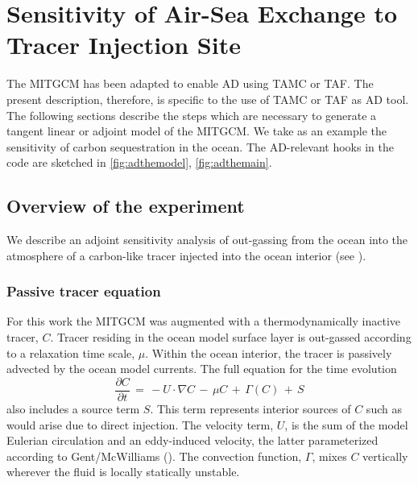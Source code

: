 
\section{Sensitivity of Air-Sea Exchange to Tracer Injection Site }
\label{www:tutorials}
\label{sect:eg-simple-tracer-adjoint}
\label{sec_ad_setup_ex}
\label{sect:tutorialIII}

The MITGCM has been adapted to enable AD using TAMC or TAF.
The present description, therefore, is specific to the
use of TAMC or TAF as AD tool.
The following sections describe the steps which are necessary to 
generate a tangent linear or adjoint model of the MITGCM.
We take as an example the sensitivity of carbon sequestration
in the ocean.
The AD-relevant hooks in the code are sketched in 
\ref{fig:adthemodel}, \ref{fig:adthemain}.

\subsection{Overview of the experiment}
\label{www:tutorials}

We describe an adjoint sensitivity analysis of out-gassing from 
the ocean into the atmosphere of a carbon-like tracer injected
into the ocean interior (see \cite{hil-eta:01}).

\subsubsection{Passive tracer equation}
\label{www:tutorials}

For this work the MITGCM was augmented with a thermodynamically 
inactive tracer, $C$. Tracer residing in the ocean 
model surface layer is out-gassed according to a relaxation time scale, 
$\mu$. Within the ocean interior, the tracer is passively advected 
by the ocean model currents. The full equation for the time evolution
%
\begin{equation}
\label{carbon_ddt}
\frac{\partial C}{\partial t} \, = \, 
-U\cdot \nabla C \, - \, \mu C \, + \, \Gamma(C) \,+ \, S
\end{equation}
%
also includes a source term $S$. This term 
represents interior sources of $C$ such as would arise due to
direct injection.
The velocity term, $U$, is the sum of the
model Eulerian circulation and an eddy-induced velocity, the latter
parameterized according to Gent/McWilliams 
(\cite{gen-mcw:90, gen-eta:95}).
The convection function, $\Gamma$, mixes $C$ vertically wherever the 
fluid is locally statically unstable. 

